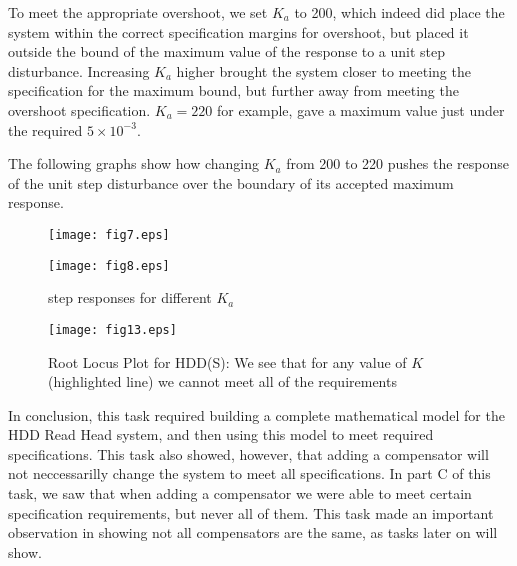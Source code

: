 \documentclass{article}
\newcommand{\matlab}[1]{%
%
}
\begin{document}
To meet the appropriate overshoot, we set $K_a$ to 200, which
indeed did place the system within the correct specification margins for
overshoot, but placed it outside the bound of the maximum value of the response
 to a unit step disturbance. Increasing $K_a$ higher brought the system
closer to meeting the specification for the maximum bound, but further away from
meeting the overshoot specification. $K_a = 220$ for example, gave a maximum
value just under the required $5\times 10^{-3}$.

The following graphs show how changing $K_a$ from 200 to 220 pushes
the response of the unit step disturbance over the boundary of its
accepted maximum response.

\begin{figure}\centering
  \begin{minipage}{0.5\linewidth}
    \matlab{fig7.m}%
  \end{minipage}%
  \begin{minipage}{0.5\linewidth}
    \matlab{fig8.m}
  \end{minipage}%
\end{figure}

\begin{figure}[H]\centering
  \caption{step responses for different $K_a$}
  \begin{minipage}{9cm}
    \texttt{[image: fig7.eps]}
  \end{minipage}%
  \begin{minipage}{9cm}
    \texttt{[image: fig8.eps]}
  \end{minipage}
\end{figure}

\begin{figure}[H]
  \caption{Root Locus Plot for HDD(S): We see that for any value of $K$ 
  (highlighted line) we cannot meet all of the requirements}
  \centering
  \texttt{[image: fig13.eps]}
\end{figure}

In conclusion, this task required building a complete mathematical model for
the HDD Read Head system, and then using this model to meet required
specifications. This task also showed, however, that adding a compensator will
not neccessarilly change the system to meet all specifications. In part C of
this task, we saw that when adding a compensator we were able to meet certain
specification requirements, but never all of them. This task made an important
observation in showing not all compensators are the same, as tasks later on
will show.
\end{document}
